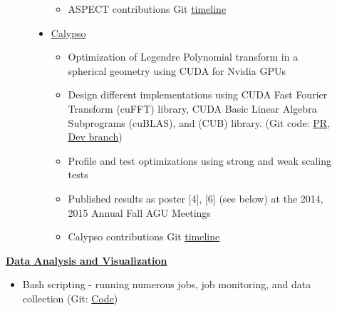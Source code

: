 \documentclass[11pt]{ltxdoc}
\begin{document}
\begin{description}
\begin{description}
\begin{itemize}
\begin{itemize}
            \item ASPECT contributions Git \href{https://github.com/geodynamics/aspect/commits?author=hlokavarapu}{timeline}

           \end{itemize}

        \item       \href{https://geodynamics.org/cig/software/calypso/}{Calypso}         

          \begin{itemize}
          	
          	\item Optimization of Legendre Polynomial transform in a spherical geometry using CUDA for Nvidia GPUs 
          	
          	\item Design different implementations using CUDA Fast Fourier Transform (cuFFT) library, CUDA Basic Linear Algebra Subprograms (cuBLAS), and (CUB) library. (Git code: \href{https://github.com/geodynamics/calypso/pull/3}{PR}, \href{https://github.com/hlokavarapu/calypso/tree/concurrency/src/Cuda_libraries}{Dev branch})
          	
          	\item Profile and test optimizations using strong and weak scaling tests
          	
          	\item Published results as poster [4], [6] (see below) at the 2014, 2015 Annual Fall AGU Meetings
          	
          	\item Calypso contributions Git \href{https://github.com/geodynamics/calypso/commits/Legendre_transform_w_symmetry}{timeline}
          \end{itemize}
           

      \end{itemize}

    
    \end{description}
    
    \item[] \textbf{\underline{Data Analysis and Visualization}}
    
      \begin{itemize}
      
        \item Bash scripting - running numerous jobs, job monitoring, and data collection (Git: \href{https://github.com/hlokavarapu/computational_tools/tree/master/slurm_scripts}{Code})
      	    	

\end{itemize}
\end{description}
\end{document}
